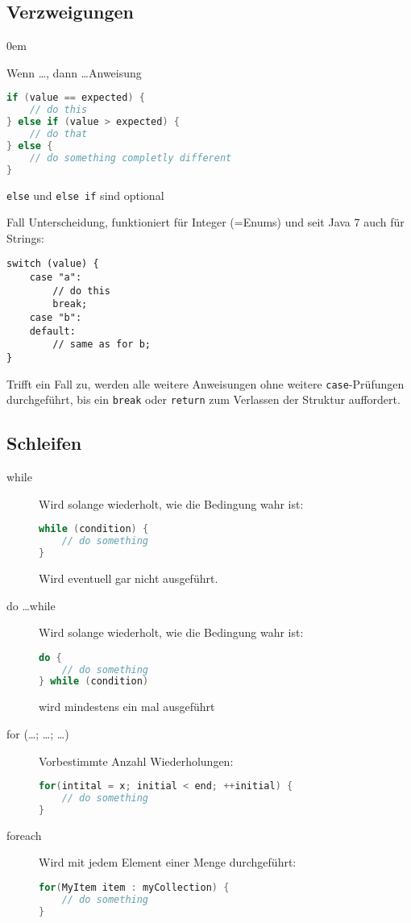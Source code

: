 \subsection{Verzweigungen}
\begin{description}\itemsep0em
	\item [if \dots else] Wenn \dots, dann \dots Anweisung
	\begin{lstlisting}[language=Java]
if (value == expected) {
	// do this
} else if (value > expected) {
	// do that
} else {
	// do something completly different
} 
	\end{lstlisting}
	\texttt{else} und \texttt{else if} sind optional
	\item [switch] Fall Unterscheidung, funktioniert für Integer (=Enums) und seit Java 7 auch für Strings:
	\begin{lstlisting}
switch (value) {
	case "a":
		// do this
		break;
	case "b":
	default:
		// same as for b;
}
	\end{lstlisting}
Trifft ein Fall zu, werden alle weitere Anweisungen ohne weitere \texttt{case}-Prüfungen durchgeführt, bis ein \texttt{break} oder \texttt{return} zum Verlassen der Struktur auffordert.
\end{description}

\subsection{Schleifen}
\begin{description}

\item [while] Wird solange wiederholt, wie die Bedingung wahr ist:
\begin{lstlisting}[language=Java]
while (condition) {
	// do something
}
\end{lstlisting}
Wird eventuell gar nicht ausgeführt.


\item [do \dots while] Wird solange wiederholt, wie die Bedingung wahr ist:
\begin{lstlisting}[language=Java]
do {
	// do something
} while (condition)
\end{lstlisting}
wird mindestens ein mal ausgeführt

\item [for (\dots; \dots; \dots)] Vorbestimmte Anzahl Wiederholungen:
\begin{lstlisting}[language=Java]
for(intital = x; initial < end; ++initial) {
	// do something
}
\end{lstlisting}

\item [foreach] Wird mit jedem Element einer Menge durchgeführt:
\begin{lstlisting}[language=Java]
for(MyItem item : myCollection) {
	// do something
}
\end{lstlisting}
\end{description}

